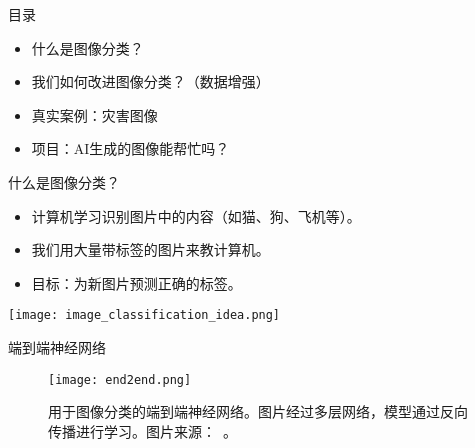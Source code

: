 
\begin{frame}{目录}
  \begin{itemize}
    \item 什么是图像分类？
    \item 我们如何改进图像分类？（数据增强）
    \item 真实案例：灾害图像
    \item 项目：AI生成的图像能帮忙吗？
  \end{itemize}
\end{frame}



\begin{frame}{什么是图像分类？}
  \begin{itemize}
    \item 计算机学习识别图片中的内容（如猫、狗、飞机等）。
    \item 我们用大量带标签的图片来教计算机。
    \item 目标：为新图片预测正确的标签。
  \end{itemize}
  \centering
  \texttt{[image: image\_classification\_idea.png]}
\end{frame}

\begin{refsection}
  \begin{frame}{端到端神经网络}
    \begin{figure}
      \centering
      \texttt{[image: end2end.png]}
      \caption[]{\scriptsize 用于图像分类的端到端神经网络。图片经过多层网络，模型通过反向传播进行学习。图片来源：~\cite{he2025endtoend}。}
    \end{figure}
    \bottomleftrefs
  \end{frame}
  \end{refsection}

